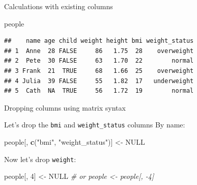 \documentclass[ignorenonframetext,]{beamer}
\newenvironment{Shaded}{\begin{snugshade}}{\end{snugshade}}
\newcommand{\CommentTok}[1]{\textcolor[rgb]{0.56,0.35,0.01}{\textit{#1}}}
\newcommand{\DecValTok}[1]{\textcolor[rgb]{0.00,0.00,0.81}{#1}}
\newcommand{\KeywordTok}[1]{\textcolor[rgb]{0.13,0.29,0.53}{\textbf{#1}}}
\newcommand{\NormalTok}[1]{#1}
\newcommand{\OtherTok}[1]{\textcolor[rgb]{0.56,0.35,0.01}{#1}}
\newcommand{\StringTok}[1]{\textcolor[rgb]{0.31,0.60,0.02}{#1}}
\begin{document}
\begin{frame}[fragile]{Calculations with existing columns}
\protect\hypertarget{calculations-with-existing-columns-2}{}

\begin{Shaded}
\begin{Highlighting}[]
\NormalTok{people}
\end{Highlighting}
\end{Shaded}

\begin{verbatim}
##    name age child weight height bmi weight_status
## 1  Anne  28 FALSE     86   1.75  28    overweight
## 2  Pete  30 FALSE     63   1.70  22        normal
## 3 Frank  21  TRUE     68   1.66  25    overweight
## 4 Julia  39 FALSE     55   1.82  17   underweight
## 5  Cath  NA  TRUE     56   1.72  19        normal
\end{verbatim}

\end{frame}

\begin{frame}[fragile]{Dropping columns using matrix syntax}
\protect\hypertarget{dropping-columns-using-matrix-syntax}{}

Let's drop the \texttt{bmi} and \texttt{weight\_status} columns By name:

\begin{Shaded}
\begin{Highlighting}[]
\NormalTok{people[, }\KeywordTok{c}\NormalTok{(}\StringTok{"bmi"}\NormalTok{, }\StringTok{"weight_status"}\NormalTok{)] <-}\StringTok{ }\OtherTok{NULL} 
\end{Highlighting}
\end{Shaded}

Now let's drop \texttt{weight}:

\begin{Shaded}
\begin{Highlighting}[]
\NormalTok{people[, }\DecValTok{4}\NormalTok{] <-}\StringTok{ }\OtherTok{NULL} 
\CommentTok{# or people <- people[, -4] }
\end{Highlighting}
\end{Shaded}

\end{frame}
\end{document}
